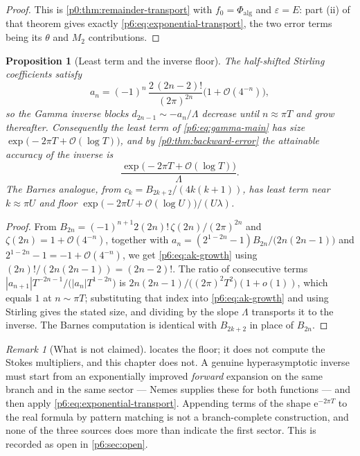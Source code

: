\documentclass[11pt,a4paper,oneside]{book}
\theoremstyle{plain}
\newtheorem{proposition}[theorem]{Proposition}
\theoremstyle{definition}
\theoremstyle{remark}
\newtheorem{remark}[theorem]{Remark}
\newcommand{\e}{\mathrm{e}}
\newcommand{\bigO}{\mathcal{O}}
\newcommand{\littleo}{o}
\begin{document}
\begin{proof}
This is \cref{p0:thm:remainder-transport} with $f_0=\Phi_{\mathrm{alg}}$ and
$\varepsilon=E$: part (ii) of that theorem gives exactly
\eqref{p6:eq:exponential-transport}, the two error terms being its $\theta$
and $M_2$ contributions.
\end{proof}

\begin{proposition}[Least term and the inverse floor]\label{p6:prop:least-term}
The half-shifted Stirling coefficients satisfy
\begin{equation}\label{p6:eq:ak-growth}
 a_n=(-1)^{n}\,\frac{2\,(2n-2)!}{(2\pi)^{2n}}\bigl(1+\bigO(4^{-n})\bigr),
\end{equation}
so the Gamma inverse blocks $d_{2n-1}\sim-a_n/\Lambda$ decrease until
$n\approx\pi T$ and grow thereafter.  Consequently the least term of
\eqref{p6:eq:gamma-main} has size
$\exp\bigl(-2\pi T+\bigO(\log T)\bigr)$, and by
\cref{p0:thm:backward-error} the attainable accuracy of the inverse is
\begin{equation}\label{p6:eq:gamma-floor}
 \frac{\exp\bigl(-2\pi T+\bigO(\log T)\bigr)}{\Lambda}.
\end{equation}
The Barnes analogue, from $c_k=B_{2k+2}/(4k(k+1))$, has least term near
$k\approx\pi U$ and floor
$\exp\bigl(-2\pi U+\bigO(\log U)\bigr)/(U\lambda)$.
\end{proposition}

\begin{proof}
From $B_{2n}=(-1)^{n+1}2(2n)!\,\zeta(2n)/(2\pi)^{2n}$ and
$\zeta(2n)=1+\bigO(4^{-n})$, together with
$a_n=(2^{1-2n}-1)B_{2n}/\bigl(2n(2n-1)\bigr)$ and $2^{1-2n}-1=-1+\bigO(4^{-n})$,
we get \eqref{p6:eq:ak-growth} using $(2n)!/(2n(2n-1))=(2n-2)!$.  The ratio of
consecutive terms $|a_{n+1}|T^{-2n-1}/\bigl(|a_n|T^{1-2n}\bigr)$ is
$2n(2n-1)/\bigl((2\pi)^{2}T^{2}\bigr)(1+\littleo(1))$, which equals $1$ at
$n\sim\pi T$; substituting that index into \eqref{p6:eq:ak-growth} and using
Stirling gives the stated size, and dividing by the slope $\Lambda$ transports
it to the inverse.  The Barnes computation is identical with
$B_{2k+2}$ in place of $B_{2n}$.
\end{proof}

\begin{remark}[What is not claimed]\label{p6:rem:not-claimed}
 locates the floor; it does not compute the Stokes
multipliers, and this chapter does not.  A genuine hyperasymptotic inverse
must start from an exponentially improved \emph{forward} expansion on the same
branch and in the same sector --- Nemes supplies these for both functions ---
and then apply \eqref{p6:eq:exponential-transport}.  Appending terms of the
shape $\e^{-2\pi T}$ to the real formula by pattern matching is not a
branch-complete construction, and none of the three sources does more than
indicate the first sector.  This is recorded as open in
\cref{p6:sec:open}.
\end{remark}
\end{document}
